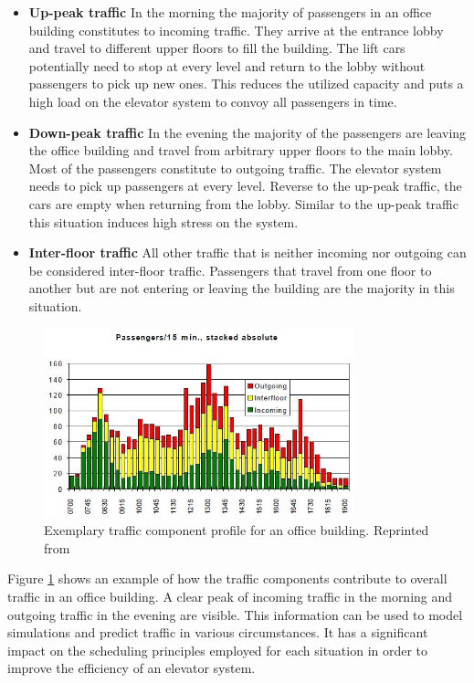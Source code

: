 \begin{itemize}
    \item \textbf{Up-peak traffic} In the morning the majority of passengers in an office building constitutes to incoming traffic.
    They arrive at the entrance lobby and travel to different upper floors to fill the building.
    The lift cars potentially need to stop at every level and return to the lobby without passengers to pick up new ones. 
    This reduces the utilized capacity and puts a high load on the elevator system to convoy all passengers in time.
    \item \textbf{Down-peak traffic} In the evening the majority of the passengers are leaving the office building and travel from arbitrary upper floors to the main lobby.
    Most of the passengers constitute to outgoing traffic.
    The elevator system needs to pick up passengers at every level. 
    Reverse to the up-peak traffic, the cars are empty when returning from the lobby.
    Similar to the up-peak traffic this situation induces high stress on the system.
    \item \textbf{Inter-floor traffic} All other traffic that is neither incoming nor outgoing can be considered inter-floor traffic. Passengers that travel from one floor to another but are not entering or leaving the building are the majority in this situation.
\end{itemize}

\begin{figure}[hbt]
	\centering
	\includegraphics[width=0.8\textwidth, keepaspectratio]{resources/traffictimes}
	\caption[Exemplary traffic component profile for an office building]{\label{fig:sota:traffictimes} Exemplary traffic component profile for an office building.
	Reprinted from \textcite[][p.~14]{siikonen1997models}}
\end{figure}

Figure \ref{fig:sota:traffictimes} shows an example of how the traffic components contribute to overall traffic in an office building. A clear peak of incoming traffic in the morning and outgoing traffic in the evening are visible.
This information can be used to model simulations and predict traffic in various circumstances.
It has a significant impact on the scheduling principles employed for each situation in order to improve the efficiency of an elevator system.

